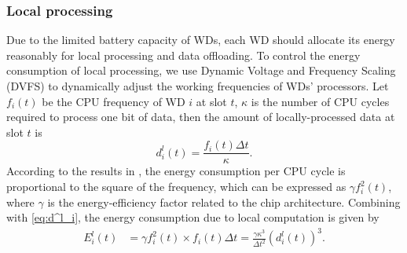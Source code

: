 \documentclass[lettersize, journal]{IEEEtran}
\begin{document}
\subsubsection{Local processing}
Due to the limited battery capacity of WDs, each WD should allocate its energy reasonably for local processing
and data offloading.
To control the energy consumption of local processing,
we use Dynamic Voltage and Frequency Scaling (DVFS) \cite{rabaey2003digital}
to dynamically adjust the working frequencies of WDs' processors.
Let $f_i(t)$ be the CPU frequency of WD $i$ at slot $t$, $\kappa$ is the number of CPU cycles required to process one bit of data,
then the amount of locally-processed data at slot $t$ is
\begin{equation}
    d^l_i(t) = \frac{f_i(t) \Delta t}{\kappa}.
    \label{eq:d^l_i}
\end{equation}
According to the results in \cite{chandrakasan1992low}, the energy consumption per CPU cycle is proportional to the square of the frequency,
which can be expressed as $\gamma f^2_i(t)$, where $\gamma$ is the energy-efficiency factor related to the chip architecture.
Combining with \eqref{eq:d^l_i}, the energy consumption due to local computation is given by
\begin{align}
    E^l_i(t) &= \gamma f^2_i(t) \times f_i(t) \Delta t = \frac{\gamma \kappa^3}{\Delta t^2} \left( d^l_i(t) \right)^3.
    \label{eq:E^l_i}
\end{align}
\end{document}
